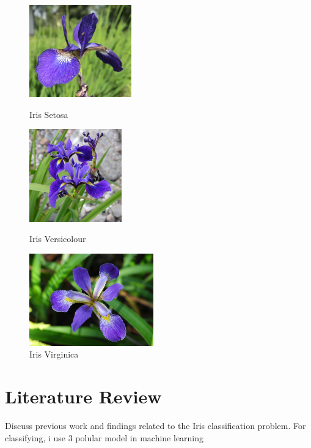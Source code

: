 \documentclass[a4paper]{article}
\begin{document}
\begin{figure}[h]
	\centering
	\begin{minipage}{0.32\textwidth}
		\centering
		\includegraphics[height=4cm]{picture/flower/Iris Setosa} %
		\caption{Iris Setosa}
		\label{fig:setosa}
	\end{minipage}\hfill
	\begin{minipage}{0.32\textwidth}
		\centering
		\includegraphics[height=4cm]{picture/flower/Iris Versicolour} %
		\caption{Iris Versicolour}
		\label{fig:versicolour}
	\end{minipage}\hfill
	\begin{minipage}{0.32\textwidth}
		\centering
		\includegraphics[height=4cm]{picture/flower/Iris Virginica} %
		\caption{Iris Virginica}
		\label{fig:virginica}
	\end{minipage}
\end{figure}

\section{Literature Review}
Discuss previous work and findings related to the Iris classification problem.
For classifying, i use 3 polular model in machine learning
\end{document}
